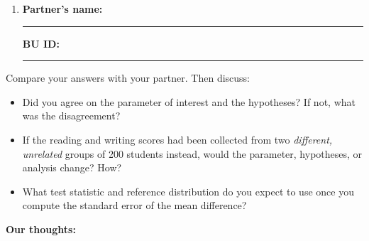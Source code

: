 \documentclass{article}
\newcommand{\nameblank}{\rule{1.75in}{0.4pt}}
\newcommand{\idblank}{\rule{1.55in}{0.4pt}}
\begin{document}
\begin{enumerate}[label=\arabic*.,leftmargin=*,itemsep=.7em, start=2]
  \item \textbf{Partner's name:} \nameblank \hfill \textbf{BU ID:} \idblank
\end{enumerate}

Compare your answers with your partner. Then discuss:

\begin{itemize}
  \item Did you agree on the parameter of interest and the hypotheses? If not, what was the disagreement?
  \item If the reading and writing scores had been collected from two \emph{different, unrelated} groups of 200 students instead, would the parameter, hypotheses, or analysis change? How?
  \item What test statistic and reference distribution do you expect to use once you compute the standard error of the mean difference?
\end{itemize}

\textbf{Our thoughts:}
\vfill
\end{document}

